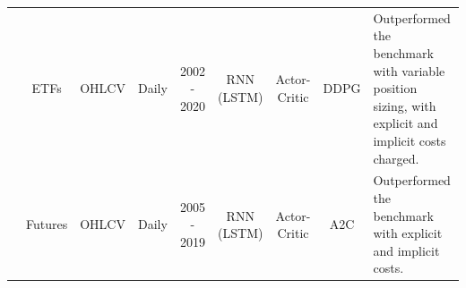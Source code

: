 \begin{table}
\begin{tabularx}{\linewidth}{@{}ccccccccX@{}}
\cite{jia_lstm-ddpg_2021} & ETFs & OHLCV & Daily & 2002 - 2020 & RNN (LSTM) & Actor-Critic & DDPG & Outperformed the benchmark with variable position sizing, with explicit and implicit costs charged. \\

\cite{zhang_deep_2020} & Futures & OHLCV & Daily & 2005 - 2019 & RNN (LSTM) & Actor-Critic & A2C & Outperformed the benchmark with explicit and implicit costs. \\
 
\bottomrule
\end{tabularx}
\end{table}